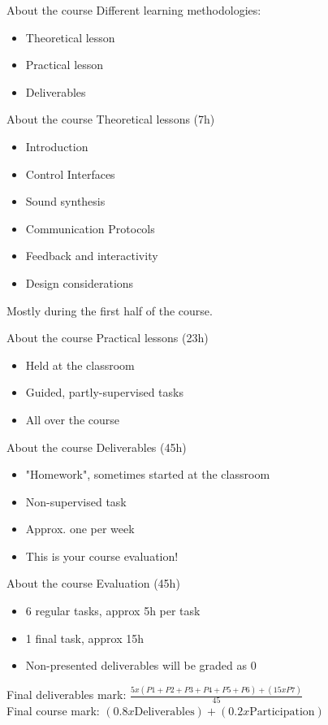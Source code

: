 \documentclass{beamer}
\begin{document}
\begin{frame}{About the course}
	Different learning methodologies:
	\begin{itemize}
		\item Theoretical lesson
		\item Practical lesson
		\item Deliverables
	\end{itemize}
\end{frame}

\begin{frame}{About the course}
	Theoretical lessons (7h)
	\begin{itemize}
		\item Introduction
		\item Control Interfaces
		\item Sound synthesis
		\item Communication Protocols
		\item Feedback and interactivity
		\item Design considerations
	\end{itemize}
	\vspace{5mm}
	Mostly during the first half of the course.
\end{frame}

\begin{frame}{About the course}
	Practical lessons (23h)
	\begin{itemize}
		\item Held at the classroom
		\item Guided, partly-supervised tasks
		\item All over the course
	\end{itemize}
\end{frame}

\begin{frame}{About the course}
	Deliverables (45h)
	\begin{itemize}
		\item "Homework", sometimes started at the classroom
		\item Non-supervised task
		\item Approx. one per week
		\item This is your course evaluation!
	\end{itemize}
\end{frame}

\begin{frame}{About the course}
	Evaluation (45h)
	\begin{itemize}
		\item 6 regular tasks, approx 5h per task
		\item 1 final task, approx 15h
		\item Non-presented deliverables will be graded as 0
	\end{itemize}
	\vspace{5mm}
	Final deliverables mark: $\frac{5 x (P1+P2+P3+P4+P5+P6) + (15 x P7)}{45}$\\
	\vspace{5mm}
	Final course mark: $(0.8x\text{Deliverables}) + (0.2x\text{Participation})$
\end{frame}
\end{document}
